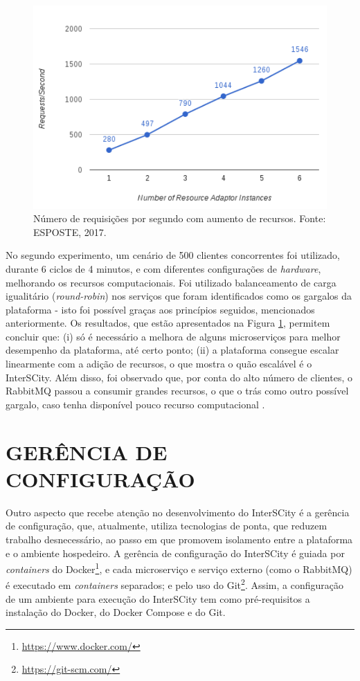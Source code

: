 \begin{figure}
  \centering
    \includegraphics[scale=0.4]{figuras/benchmark2.png}
    \caption{Número de requisições por segundo com aumento de recursos. Fonte: ESPOSTE, 2017.}
  \label{fig:benchmark2}
\end{figure}

No segundo experimento, um cenário de 500 clientes concorrentes foi utilizado, 
durante 6 ciclos de 4 minutos, e com diferentes configurações de
\textit{hardware}, melhorando os recursos computacionais. Foi utilizado
balanceamento de carga igualitário (\textit{round-robin}) nos serviços
que foram identificados como os gargalos da plataforma - isto foi possível
graças aos princípios seguidos, mencionados anteriormente. Os resultados,
que estão apresentados na Figura \ref{fig:benchmark2}, permitem concluir que:
(i) só é necessário a melhora de alguns microserviços para melhor desempenho
da plataforma, até certo ponto; (ii) a plataforma consegue escalar linearmente
com a adição de recursos, o que mostra o quão escalável é o InterSCity. Além
disso, foi observado que, por conta do alto número de clientes, o RabbitMQ
passou a consumir grandes recursos, o que o trás como outro possível gargalo,
caso tenha disponível pouco recurso computacional \cite{delesposte2017}.

\section{GERÊNCIA DE CONFIGURAÇÃO}

Outro aspecto que recebe atenção no desenvolvimento do InterSCity é a gerência
de configuração, que, atualmente, utiliza tecnologias de ponta, que reduzem
trabalho desnecessário, ao passo em que promovem isolamento entre a plataforma
e o ambiente hospedeiro. A gerência de configuração do InterSCity é guiada por
\textit{containers} do Docker\footnote{\url{https://www.docker.com/}}, e cada
microserviço e serviço externo (como o RabbitMQ) é executado em
\textit{containers} separados; e pelo uso do
Git\footnote{\url{https://git-scm.com/}}. Assim, a configuração de um ambiente
para execução do InterSCity tem como pré-requisitos a instalação do Docker, do
Docker Compose e do Git.

